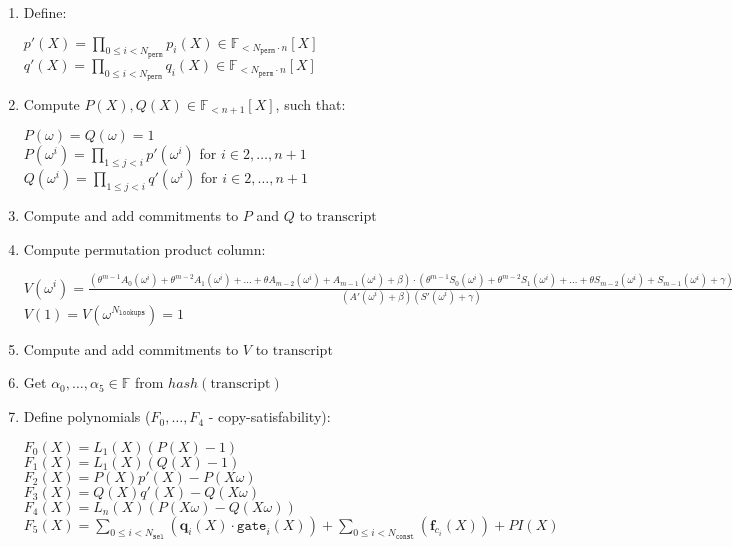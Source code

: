 \begin{enumerate}
	\item Define:
	\begin{center}
		$p'(X) = \prod\limits_{0 \leq i < N_{\texttt{perm}}} p_i(X) \in \mathbb{F}_{<N_{\texttt{perm}} \cdot n}[X]$ \\
		$q'(X) = \prod\limits_{0 \leq i < N_{\texttt{perm}}} q_i(X) \in \mathbb{F}_{<N_{\texttt{perm}} \cdot n}[X]$
	\end{center}
	\item Compute $P(X), Q(X) \in \mathbb{F}_{<n+1}[X]$, such that:
	\begin{center}
		$P(\omega) = Q(\omega) = 1$ \\
		$P(\omega^i) = \prod\limits_{1 \leq j < i}p'(\omega^i)$ for $i \in {2, \dots, n + 1}$ \\
		$Q(\omega^i) = \prod\limits_{1 \leq j < i}q'(\omega^i)$ for $i \in {2, \dots, n + 1}$ \\
	\end{center}
	\item Compute and add commitments to $P$ and $Q$ to $\text{transcript}$
	\item Compute permutation product column:
	\begin{center}
	$V (\omega^i) = \frac{(\theta^{m-1} A_0(\omega^i) + \theta^{m-2} A_1(\omega^i) + ... + \theta A_{m-2}(\omega^i) + A_{m-1}(\omega^i) + \beta) \cdot (\theta^{m-1} S_0(\omega^i) + \theta^{m-2} S_1(\omega^i) + ... + \theta S_{m-2}(\omega^i) + S_{m-1}(\omega^i) + \gamma)} {(A'(\omega^i) + \beta) (S'(\omega^i) + \gamma)}$ \\
	$V (1) = V (\omega^{N_{\texttt{lookups}}}) = 1$
	\end{center}
	\item Compute and add commitments to $V$ to $\text{transcript}$
	\item Get $\alpha_0, \dots, \alpha_5 \in \mathbb{F}$ from $hash(\text{transcript})$
	\item Define polynomials ($F_0, \dots, F_4$ - copy-satisfability):
	\begin{center}
		$F_0(X) = L_1(X)(P(X) - 1)$\\
		$F_1(X) = L_1(X)(Q(X) - 1)$ \\
		$F_2(X) = P(X)p'(X) - P(X\omega)$ \\
		$F_3(X) = Q(X)q'(X) - Q(X\omega)$ \\
		$F_4(X) = L_n(X)(P(X\omega) - Q(X\omega))$ \\
		$F_5(X) = \sum\limits_{0 \leq i < N_{\texttt{sel}}} (\textbf{q}_{i}(X) \cdot \texttt{gate}_i(X))
			+ \sum\limits_{0 \leq i < N_{\texttt{const}}}(\textbf{f}_{c_i}(X)) + PI(X)$

\end{center}
\end{enumerate}
